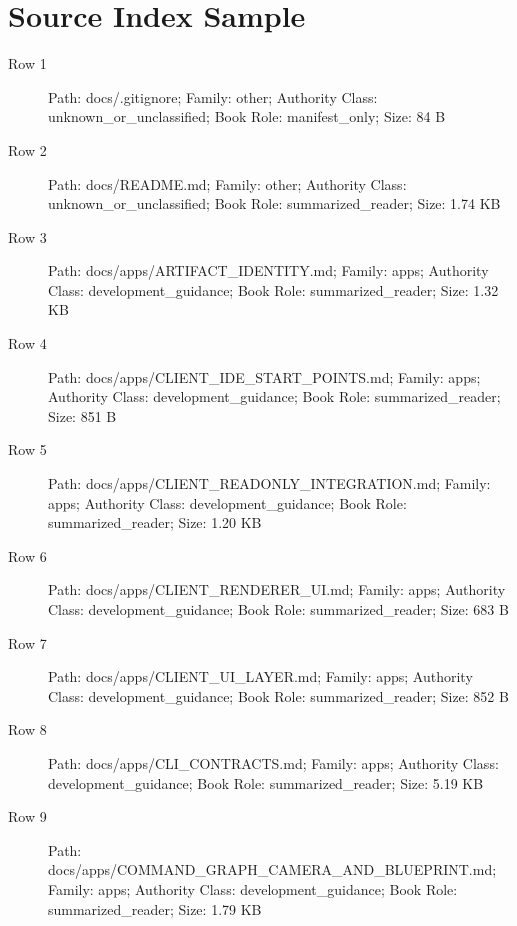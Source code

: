 \documentclass[9pt,a4paper]{book}
\begin{document}
\chapter{Source Index Sample}

\begin{description}
\item[Row 1] Path: docs/\allowbreak{}.\allowbreak{}gitignore; Family: other; Authority Class: unknown\_\allowbreak{}or\_\allowbreak{}unclassified; Book Role: manifest\_\allowbreak{}only; Size: 84 B
\item[Row 2] Path: docs/\allowbreak{}README.\allowbreak{}md; Family: other; Authority Class: unknown\_\allowbreak{}or\_\allowbreak{}unclassified; Book Role: summarized\_\allowbreak{}reader; Size: 1.\allowbreak{}74 KB
\item[Row 3] Path: docs/\allowbreak{}apps/\allowbreak{}ARTIFACT\_\allowbreak{}IDENTITY.\allowbreak{}md; Family: apps; Authority Class: development\_\allowbreak{}guidance; Book Role: summarized\_\allowbreak{}reader; Size: 1.\allowbreak{}32 KB
\item[Row 4] Path: docs/\allowbreak{}apps/\allowbreak{}CLIENT\_\allowbreak{}IDE\_\allowbreak{}START\_\allowbreak{}POINTS.\allowbreak{}md; Family: apps; Authority Class: development\_\allowbreak{}guidance; Book Role: summarized\_\allowbreak{}reader; Size: 851 B
\item[Row 5] Path: docs/\allowbreak{}apps/\allowbreak{}CLIENT\_\allowbreak{}READONLY\_\allowbreak{}INTEGRATION.\allowbreak{}md; Family: apps; Authority Class: development\_\allowbreak{}guidance; Book Role: summarized\_\allowbreak{}reader; Size: 1.\allowbreak{}20 KB
\item[Row 6] Path: docs/\allowbreak{}apps/\allowbreak{}CLIENT\_\allowbreak{}RENDERER\_\allowbreak{}UI.\allowbreak{}md; Family: apps; Authority Class: development\_\allowbreak{}guidance; Book Role: summarized\_\allowbreak{}reader; Size: 683 B
\item[Row 7] Path: docs/\allowbreak{}apps/\allowbreak{}CLIENT\_\allowbreak{}UI\_\allowbreak{}LAYER.\allowbreak{}md; Family: apps; Authority Class: development\_\allowbreak{}guidance; Book Role: summarized\_\allowbreak{}reader; Size: 852 B
\item[Row 8] Path: docs/\allowbreak{}apps/\allowbreak{}CLI\_\allowbreak{}CONTRACTS.\allowbreak{}md; Family: apps; Authority Class: development\_\allowbreak{}guidance; Book Role: summarized\_\allowbreak{}reader; Size: 5.\allowbreak{}19 KB
\item[Row 9] Path: docs/\allowbreak{}apps/\allowbreak{}COMMAND\_\allowbreak{}GRAPH\_\allowbreak{}CAMERA\_\allowbreak{}AND\_\allowbreak{}BLUEPRINT.\allowbreak{}md; Family: apps; Authority Class: development\_\allowbreak{}guidance; Book Role: summarized\_\allowbreak{}reader; Size: 1.\allowbreak{}79 KB

\end{description}
\end{document}

